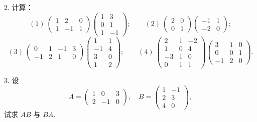 \documentclass[UTF8,12pt,a4paper,fontset=fandol]{ctexart}
\begin{document}
2. 计算：
\[
(1)\ \left(\begin{array}{ccc}
1 & 2 & 0\\
1 & -1 & 1
\end{array}\right)
\left(\begin{array}{cc}
1 & 3\\
0 & 1\\
1 & -1
\end{array}\right);
\qquad
(2)\ \left(\begin{array}{cc}
2 & 0\\
0 & 1
\end{array}\right)
\left(\begin{array}{cc}
-1 & 1\\
-2 & 0
\end{array}\right);
\]
\[
(3)\ \left(\begin{array}{cccc}
0 & 1 & -1 & 3\\
-1 & 2 & 1 & 0
\end{array}\right)
\left(\begin{array}{cc}
1 & 1\\
-1 & 4\\
3 & 0\\
1 & 2
\end{array}\right);
\qquad
(4)\ \left(\begin{array}{ccc}
2 & 1 & -2\\
1 & 0 & 4\\
-3 & 1 & 0\\
0 & 1 & 1
\end{array}\right)
\left(\begin{array}{ccc}
3 & 1 & 0\\
0 & 0 & 1\\
-1 & 2 & 0
\end{array}\right).
\]

3. 设
\[
A=\left(\begin{array}{ccc}
1 & 0 & 3\\
2 & -1 & 0
\end{array}\right),\quad
B=\left(\begin{array}{cc}
1 & -1\\
2 & 3\\
4 & 0
\end{array}\right),
\]
试求 $AB$ 与 $BA$.
\end{document}
